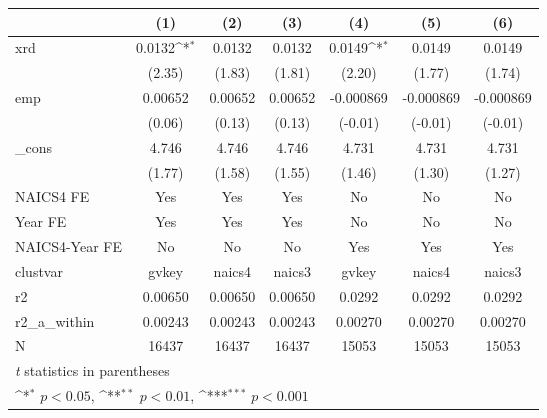 {
\def\sym#1{\ifmmode^{#1}\else\(^{#1}\)\fi}
\begin{tabular}{l*{6}{c}}
\hline\hline
            &\multicolumn{1}{c}{(1)}         &\multicolumn{1}{c}{(2)}         &\multicolumn{1}{c}{(3)}         &\multicolumn{1}{c}{(4)}         &\multicolumn{1}{c}{(5)}         &\multicolumn{1}{c}{(6)}         \\
\hline
xrd         &      0.0132\sym{*}  &      0.0132         &      0.0132         &      0.0149\sym{*}  &      0.0149         &      0.0149         \\
            &      (2.35)         &      (1.83)         &      (1.81)         &      (2.20)         &      (1.77)         &      (1.74)         \\
[1em]
emp         &     0.00652         &     0.00652         &     0.00652         &   -0.000869         &   -0.000869         &   -0.000869         \\
            &      (0.06)         &      (0.13)         &      (0.13)         &     (-0.01)         &     (-0.01)         &     (-0.01)         \\
[1em]
\_cons      &       4.746         &       4.746         &       4.746         &       4.731         &       4.731         &       4.731         \\
            &      (1.77)         &      (1.58)         &      (1.55)         &      (1.46)         &      (1.30)         &      (1.27)         \\
[1em]
NAICS4 FE   &         Yes         &         Yes         &         Yes         &          No         &          No         &          No         \\
[1em]
Year FE     &         Yes         &         Yes         &         Yes         &          No         &          No         &          No         \\
[1em]
NAICS4-Year FE&          No         &          No         &          No         &         Yes         &         Yes         &         Yes         \\
\hline
clustvar    &       gvkey         &      naics4         &      naics3         &       gvkey         &      naics4         &      naics3         \\
r2          &     0.00650         &     0.00650         &     0.00650         &      0.0292         &      0.0292         &      0.0292         \\
r2\_a\_within &     0.00243         &     0.00243         &     0.00243         &     0.00270         &     0.00270         &     0.00270         \\
N           &       16437         &       16437         &       16437         &       15053         &       15053         &       15053         \\
\hline\hline
\multicolumn{7}{l}{\footnotesize \textit{t} statistics in parentheses}\\
\multicolumn{7}{l}{\footnotesize \sym{*} \(p<0.05\), \sym{**} \(p<0.01\), \sym{***} \(p<0.001\)}\\
\end{tabular}
}
